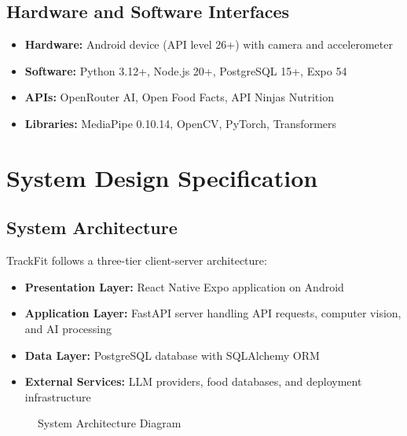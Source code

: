 \documentclass[12pt]{report}
\begin{document}
\section{Hardware and Software Interfaces}
\begin{itemize}
    \item \textbf{Hardware:} Android device (API level 26+) with camera and accelerometer
    \item \textbf{Software:} Python 3.12+, Node.js 20+, PostgreSQL 15+, Expo 54
    \item \textbf{APIs:} OpenRouter AI, Open Food Facts, API Ninjas Nutrition
    \item \textbf{Libraries:} MediaPipe 0.10.14, OpenCV, PyTorch, Transformers
\end{itemize}

\chapter{System Design Specification}
\section{System Architecture}
TrackFit follows a three-tier client-server architecture:
\begin{itemize}
    \item \textbf{Presentation Layer:} React Native Expo application on Android
    \item \textbf{Application Layer:} FastAPI server handling API requests, computer vision, and AI processing
    \item \textbf{Data Layer:} PostgreSQL database with SQLAlchemy ORM
    \item \textbf{External Services:} LLM providers, food databases, and deployment infrastructure
\end{itemize}

\begin{figure}[H]
    \centering
    \caption{System Architecture Diagram}
\end{figure}
\end{document}
